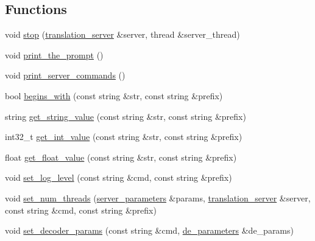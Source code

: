 \subsection*{Functions}
\begin{DoxyCompactItemize}
\item 
void \hyperlink{namespaceuva_1_1smt_1_1bpbd_1_1server_a7d9e43711d1695901561d85ad78c52ef}{stop} (\hyperlink{classuva_1_1smt_1_1bpbd_1_1server_1_1translation__server}{translation\+\_\+server} \&server, thread \&server\+\_\+thread)
\item 
void \hyperlink{namespaceuva_1_1smt_1_1bpbd_1_1server_a4801856928dba67cacf60a5073b27b62}{print\+\_\+the\+\_\+prompt} ()
\item 
void \hyperlink{namespaceuva_1_1smt_1_1bpbd_1_1server_aeb4d06a599928c221d900e7a630414a0}{print\+\_\+server\+\_\+commands} ()
\item 
bool \hyperlink{namespaceuva_1_1smt_1_1bpbd_1_1server_af54c3a6ef0c3b7ef3c01ec359b4e2d43}{begins\+\_\+with} (const string \&str, const string \&prefix)
\item 
string \hyperlink{namespaceuva_1_1smt_1_1bpbd_1_1server_a2b51ccfeb175ba10143e2466d590306c}{get\+\_\+string\+\_\+value} (const string \&str, const string \&prefix)
\item 
int32\+\_\+t \hyperlink{namespaceuva_1_1smt_1_1bpbd_1_1server_a86c43879f19a20574c39b0414db1fe8d}{get\+\_\+int\+\_\+value} (const string \&str, const string \&prefix)
\item 
float \hyperlink{namespaceuva_1_1smt_1_1bpbd_1_1server_a6520b534357e7c5fddc717e45de2f61f}{get\+\_\+float\+\_\+value} (const string \&str, const string \&prefix)
\item 
void \hyperlink{namespaceuva_1_1smt_1_1bpbd_1_1server_a7607f243d5aee3158f017c678e74efd2}{set\+\_\+log\+\_\+level} (const string \&cmd, const string \&prefix)
\item 
void \hyperlink{namespaceuva_1_1smt_1_1bpbd_1_1server_a54e62e40e91cc1e29f19e15251a493ae}{set\+\_\+num\+\_\+threads} (\hyperlink{structuva_1_1smt_1_1bpbd_1_1server_1_1server__parameters}{server\+\_\+parameters} \&params, \hyperlink{classuva_1_1smt_1_1bpbd_1_1server_1_1translation__server}{translation\+\_\+server} \&server, const string \&cmd, const string \&prefix)
\item 
void \hyperlink{namespaceuva_1_1smt_1_1bpbd_1_1server_a58e963f12403043ba7c2a5bf6e69340a}{set\+\_\+decoder\+\_\+params} (const string \&cmd, \hyperlink{namespaceuva_1_1smt_1_1bpbd_1_1server_1_1decoder_aaf4d5faf3a48156401c854d163d4b848}{de\+\_\+parameters} \&de\+\_\+params)

\end{DoxyCompactItemize}
